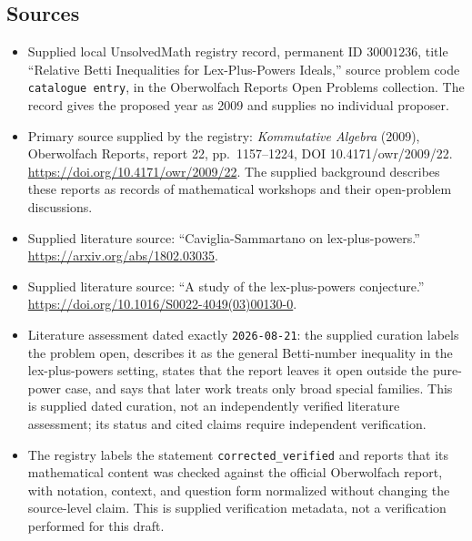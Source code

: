 \documentclass[11pt]{article}
\begin{document}
\subsection{Sources}
\begin{itemize}
\item Supplied local UnsolvedMath registry record, permanent ID \(30001236\), title ``Relative Betti Inequalities for Lex-Plus-Powers Ideals,'' source problem code \texttt{catalogue entry}, in the Oberwolfach Reports Open Problems collection. The record gives the proposed year as 2009 and supplies no individual proposer.
\item Primary source supplied by the registry: \emph{Kommutative Algebra} (2009), Oberwolfach Reports, report 22, pp.\ 1157--1224, DOI 10.4171/owr/2009/22. \url{https://doi.org/10.4171/owr/2009/22}. The supplied background describes these reports as records of mathematical workshops and their open-problem discussions.
\item Supplied literature source: ``Caviglia-Sammartano on lex-plus-powers.'' \url{https://arxiv.org/abs/1802.03035}.
\item Supplied literature source: ``A study of the lex-plus-powers conjecture.'' \url{https://doi.org/10.1016/S0022-4049(03)00130-0}.
\item Literature assessment dated exactly \texttt{2026-08-21}: the supplied curation labels the problem open, describes it as the general Betti-number inequality in the lex-plus-powers setting, states that the report leaves it open outside the pure-power case, and says that later work treats only broad special families. This is supplied dated curation, not an independently verified literature assessment; its status and cited claims require independent verification.
\item The registry labels the statement \texttt{corrected\_verified} and reports that its mathematical content was checked against the official Oberwolfach report, with notation, context, and question form normalized without changing the source-level claim. This is supplied verification metadata, not a verification performed for this draft.
\end{itemize}
\end{document}
